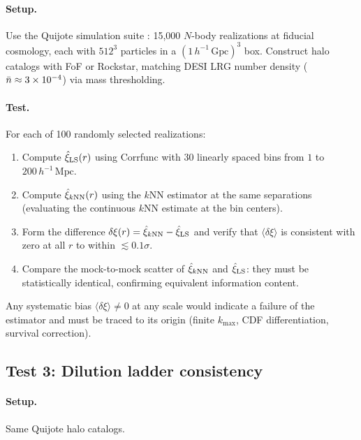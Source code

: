 \paragraph{Setup.}  Use the Quijote simulation suite \citep{VillaescusaNavarro2020}: 15,000 $N$-body realizations at fiducial cosmology, each with $512^3$ particles in a $(1\,h^{-1}\,\mathrm{Gpc})^3$ box.  Construct halo catalogs with FoF or Rockstar, matching DESI LRG number density ($\bar{n} \approx 3 \times 10^{-4}$) via mass thresholding.

\paragraph{Test.}  For each of 100 randomly selected realizations:
\begin{enumerate}[nosep]
  \item Compute $\hat{\xi}_{\mathrm{LS}}(r)$ using Corrfunc \citep{Sinha2020} with 30 linearly spaced bins from $1$ to $200\,h^{-1}\,\mathrm{Mpc}$.
  \item Compute $\hat{\xi}_{k\mathrm{NN}}(r)$ using the $k$NN estimator at the same separations (evaluating the continuous $k$NN estimate at the bin centers).
  \item Form the difference $\delta\xi(r) = \hat{\xi}_{k\mathrm{NN}} - \hat{\xi}_{\mathrm{LS}}$ and verify that $\langle\delta\xi\rangle$ is consistent with zero at all $r$ to within $\lesssim 0.1\sigma$.
  \item Compare the mock-to-mock scatter of $\hat{\xi}_{k\mathrm{NN}}$ and $\hat{\xi}_{\mathrm{LS}}$: they must be statistically identical, confirming equivalent information content.
\end{enumerate}
Any systematic bias $\langle\delta\xi\rangle \neq 0$ at any scale would indicate a failure of the estimator and must be traced to its origin (finite $k_{\max}$, CDF differentiation, survival correction).

\subsection{Test 3: Dilution ladder consistency}
\label{sec:test_ladder}

\paragraph{Setup.}  Same Quijote halo catalogs.

